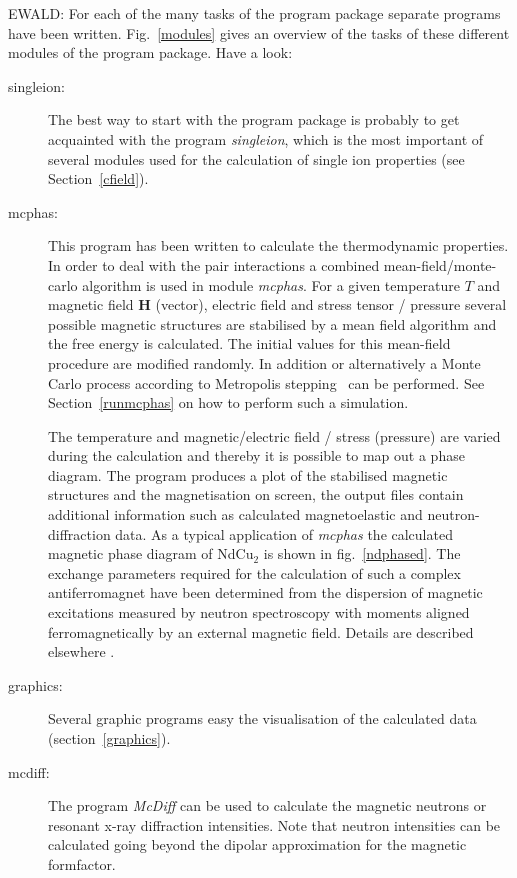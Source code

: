 \documentclass[twoside]{article}
\newcommand{\mbf}[1]{\mathbf #1}
\newcommand{\prg}{\sl}
\newcommand{\EE}{\hspace*{-1cm} EWALD: }
\begin{document}
\EE  For each of the many tasks of the program package separate programs have been written.
Fig.~\ref{modules} gives an overview of the 
tasks of these different modules of the program package. Have a look:
\begin{description}
\item[singleion:]
The best way to start with the program package is probably to get
acquainted with
the program {\prg singleion}, which is the most important of several 
modules used for the calculation of single ion properties (see Section~\ref{cfield}).
\item[mcphas:]
This program has been written to calculate the thermodynamic properties.
In order to  deal with the pair interactions a
 combined mean-field/monte-carlo algorithm is used in module {\prg mcphas}.
For a given temperature $T$ and magnetic field $\mbf H$ (vector), electric
field and stress tensor / pressure 
 several possible magnetic structures are stabilised
by a mean field algorithm and the free energy is 
calculated. The initial values for this mean-field procedure are
modified randomly. In addition or alternatively  a Monte Carlo process according to Metropolis
stepping~\cite{metropolis53-1087} can be performed.
See Section~\ref{runmcphas} on how to perform such a simulation.


The temperature and magnetic/electric field / stress (pressure) are varied during the calculation
and thereby it is possible to map out a phase diagram.
The program produces a plot of the stabilised magnetic
structures and the magnetisation on screen, the
output files contain additional information 
such as calculated magnetoelastic and  neutron-diffraction
data. As a typical application of {\prg mcphas} the calculated magnetic
phase diagram of NdCu$_2$ is shown in fig.~\ref{ndphased}.
The exchange parameters required for the calculation of such a complex
antiferromagnet have
been determined from the dispersion of magnetic excitations
measured by neutron spectroscopy with moments aligned ferromagnetically
by an external magnetic field. Details are described elsewhere \cite{rotter00-29}.

\item[graphics:]
Several graphic programs easy the visualisation of the
calculated data (section~\ref{graphics}).

\item[mcdiff:]
The program {\prg McDiff} can be used to calculate the magnetic neutrons
or resonant x-ray diffraction intensities. Note that neutron intensities
can be calculated going beyond the dipolar approximation for the magnetic
formfactor.


\end{description}
\end{document}
